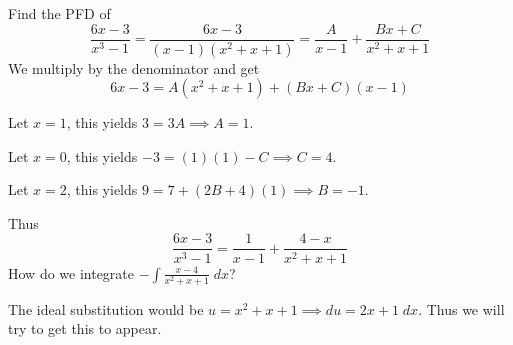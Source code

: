 \documentclass{article}
\begin{document}
\begin{example}
  Find the PFD of \[
    \frac{6x-3}{x^3 - 1} = \frac{6x-3}{(x-1)(x^2 + x + 1)} = \frac{A}{x-1} + \frac{Bx + C}{x^2 + x + 1}
  \]
  We multiply by the denominator and get \[
    6x-3 = A(x^2 + x + 1) + (Bx + C)(x-1)
  \]

  Let $x = 1$, this yields $3 = 3A \implies A = 1$.

  Let $x = 0$, this yields $-3 = (1)(1) - C \implies C = 4$.

  Let $x = 2$, this yields $9 = 7 + (2B + 4)(1) \implies B = -1$.

  Thus \[
    \frac{6x-3}{x^3 - 1} = \frac{1}{x-1} + \frac{4-x}{x^2+x+1}
  \]
  How do we integrate $-\int \frac{x-4}{x^2+x+1} \; dx$?

  The ideal substitution would be $u = x^2+x+1 \implies du = 2x+1 \; dx$. Thus we will try to get this to appear.


\end{example}
\end{document}
